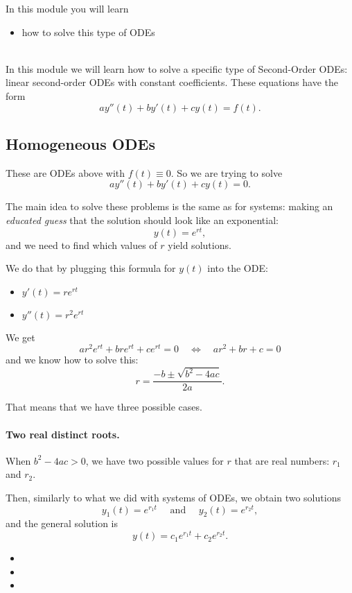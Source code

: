 In this module you will learn
\begin{itemize}
	\item how to solve this type of ODEs
\end{itemize}

\hfill \\

In this module we will learn how to solve a specific type of Second-Order ODEs: linear second-order ODEs with constant coefficients. These equations have the form
$$
a y''(t)  + b y'(t) + c y(t) = f(t).
$$

\subsection{Homogeneous ODEs}

These are ODEs above with $f(t) \equiv 0$.
So we are trying to solve
$$
a y''(t)  + b y'(t) + c y(t) = 0.
$$

The main idea to solve these problems is the same as for systems: making an \emph{educated guess} that the solution should look like an exponential:
$$
y(t) = e^{rt},
$$
and we need to find which values of $r$ yield solutions.

We do that by plugging this formula for $y(t)$ into the ODE:
\begin{itemize}
	\item $y'(t) = r e^{rt}$
	\item $y''(t) = r^2 e^{rt}$
\end{itemize}

We get
$$
a r^2 e^{rt} + br e^{rt} + c e^{rt} = 0
\quad \Leftrightarrow \quad 
	a r^2 + br + c = 0
$$
and we know how to solve this:
$$
r = \frac{-b \pm \sqrt{b^2-4ac}}{2a}.
$$

That means that we have three possible cases.





\paragraph{\color{cyan}Two real distinct roots.} When $b^2-4ac > 0$, we have two possible values for $r$ that are real numbers: $r_1$ and $r_2$.

Then, similarly to what we did with systems of ODEs, we obtain two solutions
$$
y_1(t) = e^{r_1 t} \quad \text{ and } \quad y_2(t) = e^{r_2 t},
$$
and the general solution is
$$
y(t) = c_1 e^{r_1 t} + c_2 e^{r_2 t}.
$$

\begin{video}
\begin{itemize}
	\item {}
	\item {}
	\item {}
\end{itemize}	
\end{video}



